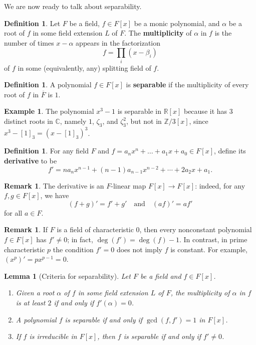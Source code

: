 \documentclass[12pt]{report}
\newtheorem{lemma}[theorem]{Lemma}
\numberwithin{equation}{section}
\numberwithin{theorem}{chapter}
\theoremstyle{definition}
\newtheorem{definition}[theorem]{Definition}
\newtheorem{example}[theorem]{Example}
\newtheorem*{basic properties}{Basic Properties}
\newtheorem*{Important Remark}{Important Remark}
\newtheorem{remark}[theorem]{Remark}
\newcommand{\df}[1]{{\bf #1}\index{#1}}
\newcommand{\R}{\mathbb{R}}
\newcommand{\Z}{\mathbb{Z}}
\newcommand{\C}{\mathbb{C}}
\begin{document}
We are now ready to talk about separability.

\begin{definition}
Let $F$ be a field, $f \in F[x]$ be a monic polynomial, and $\alpha$ be a root of $f$ in some field extension $L$ of $F$. The \df{multiplicity} of $\alpha$ in $f$ is the number of times $x - \alpha$ appears in the factorization 
$$f = \prod_i (x - \beta_i)$$ 
of $f$ in some (equivalently, any) splitting field of $f$.
\end{definition}


\begin{definition}
	A polynomial $f \in F[x]$ is {\bf separable} if the multiplicity of every root of $f$ in $\overline{F}$ is $1$.
\end{definition}


\begin{example}
The polynomial $x^3-1$ is separable in $\R[x]$ because it has 3 distinct roots in $\C$, namely $1$, $\zeta_3$, and $\zeta_3^2$, but not in $\Z/3[x]$, since $x^3-[1]_3=(x-[1]_3)^3$.
\end{example}


\begin{definition}
For any field $F$ and $f = a_n x^n + \dots + a_1 x + a_0 \in F[x]$, define its \df{derivative} to be
$$f' = n a_n x^{n-1} + (n-1) a_{n-1} x^{n-2} + \cdots + 2 a_2 x + a_1.$$
\end{definition}


\begin{remark}
The derivative is an $F$-linear map $F[x] \to F[x]$: indeed, for any $f, g \in F[x]$, we have
$$(f + g)' = f' + g' \quad \textrm{and} \quad (a f)' = a f'$$
for all $a \in F$.
\end{remark}


\begin{remark}
	If $F$ is a field of characteristic $0$, then every nonconstant polynomial $f \in F[x]$ has $f' \neq 0$; in fact, $\deg(f') = \deg(f) -1$. In contrast, in prime characteristic $p$ the condition $f' = 0$ does not imply $f$ is constant. For example, $(x^p)' = px^{p-1} = 0$.
\end{remark}



\begin{lemma}[Criteria for separability]\label{criteria separability}
Let $F$ be a field and $f \in F[x]$.
\begin{enumerate}[label=\alph*),leftmargin=15pt]
\item Given a root $\alpha$ of $f$ in some field extension $L$ of $F$, the multiplicity of $\alpha$ in $f$ is at least $2$ if and only if $f'(\alpha) = 0$.
\item A polynomial $f$ is separable if and only if $\gcd(f, f') = 1$ in $F[x]$. 
\item If $f$ is irreducible in $F[x]$, then $f$ is separable if and only if $f' \neq 0$.
\end{enumerate}
\end{lemma}
\end{document}
